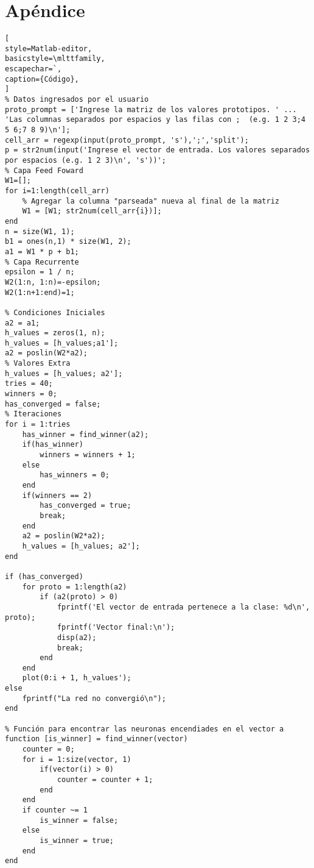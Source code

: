\documentclass{article}
\begin{document}
\section{Apéndice}
\begin{lstlisting}[
style=Matlab-editor,
basicstyle=\mlttfamily,
escapechar=`,
caption={Código},
]
% Datos ingresados por el usuario
proto_prompt = ['Ingrese la matriz de los valores prototipos. ' ...
'Las columnas separados por espacios y las filas con ;  (e.g. 1 2 3;4 5 6;7 8 9)\n'];
cell_arr = regexp(input(proto_prompt, 's'),';','split');
p = str2num(input('Ingrese el vector de entrada. Los valores separados por espacios (e.g. 1 2 3)\n', 's'))';
% Capa Feed Foward
W1=[];
for i=1:length(cell_arr)
	% Agregar la columna "parseada" nueva al final de la matriz
	W1 = [W1; str2num(cell_arr{i})];
end
n = size(W1, 1);
b1 = ones(n,1) * size(W1, 2);
a1 = W1 * p + b1;
% Capa Recurrente
epsilon = 1 / n;
W2(1:n, 1:n)=-epsilon;
W2(1:n+1:end)=1;

% Condiciones Iniciales
a2 = a1;
h_values = zeros(1, n);
h_values = [h_values;a1'];
a2 = poslin(W2*a2);
% Valores Extra
h_values = [h_values; a2'];
tries = 40;
winners = 0;
has_converged = false;
% Iteraciones
for i = 1:tries
	has_winner = find_winner(a2);
	if(has_winner)
		winners = winners + 1;
	else
		has_winners = 0;
	end
	if(winners == 2)
		has_converged = true;
		break;
	end
	a2 = poslin(W2*a2);
	h_values = [h_values; a2'];
end

if (has_converged)
	for proto = 1:length(a2)
		if (a2(proto) > 0)
			fprintf('El vector de entrada pertenece a la clase: %d\n', proto);
			fprintf('Vector final:\n');
			disp(a2);
			break;
		end
	end
	plot(0:i + 1, h_values');
else
	fprintf("La red no convergió\n");
end

% Función para encontrar las neuronas encendiades en el vector a
function [is_winner] = find_winner(vector)
	counter = 0;
	for i = 1:size(vector, 1)
		if(vector(i) > 0)
			counter = counter + 1;
		end 
	end
	if counter ~= 1
		is_winner = false;
	else
		is_winner = true;
	end
end
\end{lstlisting}
\end{document}
